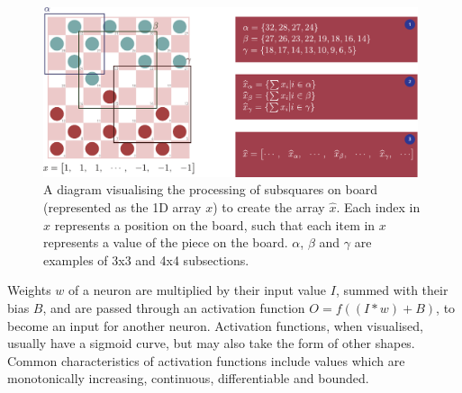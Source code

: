 \documentclass[12pt,a4paper]{article}
\begin{document}
        \begin{figure}[!ht]
            \centering
            \includegraphics[width=110mm]{images/subsquares.pdf}
            \caption{A diagram visualising the processing of subsquares on board (represented as the 1D array $x$) to create the array $\widehat{x}$. Each index in $x$ represents a position on the board, such that each item in $x$ represents a value of the piece on the board. $\alpha$, $\beta$ and $\gamma$ are examples of 3x3 and 4x4 subsections. \label{subsquares}}
        \end{figure}

        Weights $w$ of a neuron are multiplied by their input value $I$, summed with their bias $B$, and are passed through an activation function $O = f((I* w) + B)$, to become an input for another neuron. Activation functions, when visualised, usually have a sigmoid curve, but may also take the form of other shapes. Common characteristics of activation functions include values which are monotonically increasing, continuous, differentiable and bounded. 
\end{document}
